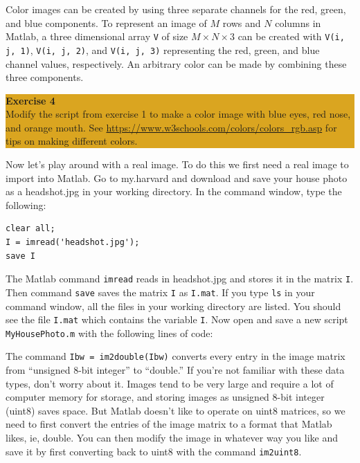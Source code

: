 \documentclass[12pt]{amsart}
\begin{document}
\noindent Color images can be created by using three separate channels for the red, green, and blue components.  To represent an image of $M$ rows and $N$ columns in Matlab, a three dimensional array \verb+V+ of size $ M \times N \times 3$ can be created with \verb+V(i, j, 1)+, \verb+V(i, j, 2)+, and \verb+V(i, j, 3)+ representing the red, green, and blue channel values, respectively.  An arbitrary color can be made by combining these three components.  
\bigskip
\begin{center}
\colorbox{Goldenrod}{\parbox{15cm}{
{
\textbf{\large Exercise 4}\vspace{1mm} \\
Modify the script from exercise 1 to make a color image with blue eyes, red nose, and orange mouth.  See \url{https://www.w3schools.com/colors/colors_rgb.asp} for tips on making different colors.}}}
\end{center}
\bigskip
\noindent Now let's play around with a real image.  To do this we first need a real image to import into Matlab.  Go to my.harvard and download and save your house photo as a headshot.jpg in your working directory.  In the command window, type the following:  
\bigskip
\begin{verbatim}
clear all;
I = imread('headshot.jpg');
save I
\end{verbatim}
\bigskip

\noindent The Matlab command \verb+imread+ reads in headshot.jpg and stores it in the matrix \verb+I+.  Then command \verb+save+ saves the matrix \verb+I+ as \verb+I.mat+.  If you type \verb+ls+ in your command window, all the files in your working directory are listed.  You should see the file \verb+I.mat+ which contains the variable \verb+I+.  Now open and save a new script \verb+MyHousePhoto.m+ with the following lines of code:



\smallskip

\noindent The command \verb+Ibw = im2double(Ibw)+ converts every entry in the image matrix from ``unsigned 8-bit integer'' to ``double.''  If you're not familiar with these data types, don't worry about it.  Images tend to be very large and require a lot of computer memory for storage, and storing images as unsigned 8-bit integer (uint8) saves space.    But Matlab doesn't like to operate on uint8 matrices, so we need to first convert the entries of the image matrix to a format that Matlab likes, ie, double.  You can then modify the image in whatever way you like and save it by first converting back to uint8 with the command \verb+im2uint8+.
\end{document}

